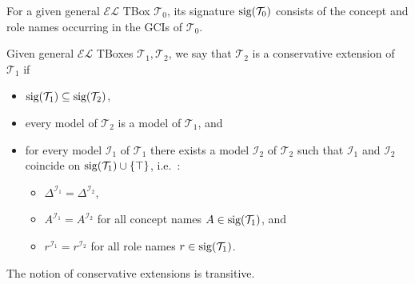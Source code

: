 \begin{definition}
	For a given general $\mathcal{EL}$ TBox $\mathcal{T}_0$, its signature $\operatorname{\text{sig}}(\mathcal{T}_0)$
	consists of the concept and role names occurring in the GCIs of $\mathcal{T}_0$.

	Given general $\mathcal{EL}$ TBoxes $\mathcal{T}_1, \mathcal{T}_2$, we say that $\mathcal{T}_2$ is a conservative extension of $\mathcal{T}_1$ if
	\begin{itemize}
		\item $\operatorname{\text{sig}}(\mathcal{T}_1) \subseteq \operatorname{\text{sig}}(\mathcal{T}_2)$,
		\item every model of $\mathcal{T}_2$ is a model of $\mathcal{T}_1$, and
		\item for every model $\mathcal{I}_1$ of $\mathcal{T}_1$ there exists a model $\mathcal{I}_2$ of $\mathcal{T}_2$ 
			such that $\mathcal{I}_1$ and $\mathcal{I}_2$ coincide on $\operatorname{\text{sig}}(\mathcal{T}_1) \cup \left\{ \top \right\}$, i.e.\ :
			\begin{itemize}
				\item $\Delta^{\mathcal{I}_1} = \Delta^{\mathcal{I}_2}$,
				\item $A^{\mathcal{I}_1} = A^{\mathcal{I}_2}$ for all concept names $A \in \operatorname{\text{sig}}(\mathcal{T}_1)$, and
				\item $r^{\mathcal{I}_1} = r^{\mathcal{I}_2}$ for all role names $r \in \operatorname{\text{sig}}(\mathcal{T}_1)$.
			\end{itemize}
	\end{itemize}
\end{definition}
\begin{note}
	The notion of conservative extensions is transitive.
\end{note}

